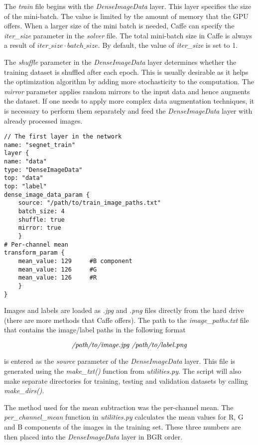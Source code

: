 The \textit{train} file begins with the \textit{DenseImageData} layer. This layer specifies the size of the mini-batch. The value is limited by the amount of memory that the GPU offers. When a larger size of the mini batch is needed, Caffe can specify the \textit{iter\_size} parameter in the \textit{solver} file. The total mini-batch size in Caffe is always a result of $iter\_size \cdot batch\_size$. By default, the value of \textit{iter\_size} is set to 1. \cite{caffe}

The \textit{shuffle} parameter in the \textit{DenseImageData} layer determines whether the training dataset is shuffled after each epoch. This is usually desirable as it helps the optimization algorithm by adding more stochasticity to the computation. The \textit{mirror} parameter applies random mirrors to the input data and hence augments the dataset. If one needs to apply more complex data augmentation techniques, it is necessary to perform them separately and feed the \textit{DenseImageData} layer with already processed images. \cite{caffe}

\begin{lstlisting}[caption={Input layer in \textit{train.prototxt} \cite{filip_github}},captionpos=b]
// The first layer in the network
name: "segnet_train"
layer {
name: "data"
type: "DenseImageData"
top: "data"
top: "label"
dense_image_data_param {
	source: "/path/to/train_image_paths.txt"
	batch_size: 4   			    			
	shuffle: true
	mirror: true	
	}
# Per-channel mean
transform_param {
	mean_value: 129		#B component
	mean_value: 126		#G
	mean_value: 126		#R
	}
}
\end{lstlisting} 

Images and labels are loaded as \textit{.jpg} and \textit{.png} files directly from the hard drive (there are more methods that Caffe offers). The path to the \textit{image\_paths.txt} file that contains the image/label paths in the following format

$$
\text{\textit{/path/to/image.jpg /path/to/label.png}}
$$

\noindent is entered as the \textit{source} parameter of the \textit{DenseImageData} layer. This file is generated using the \textit{make\_txt()} function from \textit{utilities.py}. The script will also make separate directories for training, testing and validation datasets by calling \textit{make\_dirs()}.

The method used for the mean subtraction was the per-channel mean. The \textit{per\_channel\_mean} function in \textit{utilities.py} calculates the mean values for R, G and B components of the images in the training set. These three numbers are then placed into the \textit{DenseImageData} layer in BGR order.


